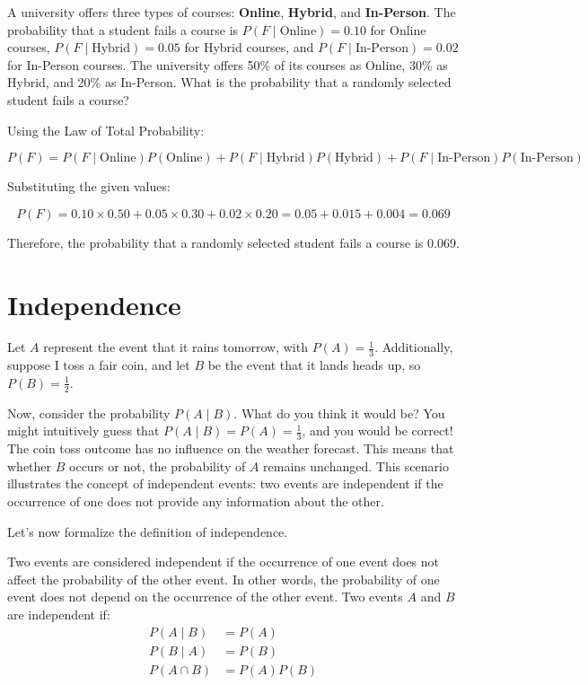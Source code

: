 \begin{example}
    A university offers three types of courses: \textbf{Online}, \textbf{Hybrid}, and \textbf{In-Person}. The probability that a student fails a course is \( P(F \mid \text{Online}) = 0.10 \) for Online courses, \( P(F \mid \text{Hybrid}) = 0.05 \) for Hybrid courses, and \( P(F \mid \text{In-Person}) = 0.02 \) for In-Person courses. The university offers 50\% of its courses as Online, 30\% as Hybrid, and 20\% as In-Person. What is the probability that a randomly selected student fails a course?
\end{example}

\begin{solution}
    Using the Law of Total Probability:

    \[
    P(F) = P(F \mid \text{Online}) P(\text{Online}) + P(F \mid \text{Hybrid}) P(\text{Hybrid}) + P(F \mid \text{In-Person}) P(\text{In-Person})
    \]

    Substituting the given values:

    \[
    P(F) = 0.10 \times 0.50 + 0.05 \times 0.30 + 0.02 \times 0.20 = 0.05 + 0.015 + 0.004 = 0.069
    \]

    Therefore, the probability that a randomly selected student fails a course is 0.069.
\end{solution}

\section{Independence}
Let $A$ represent the event that it rains tomorrow, with $P(A)=\frac{1}{3}$. Additionally, suppose I toss a fair coin, and let $B$ be the event that it lands heads up, so $P(B)=\frac{1}{2}$.

Now, consider the probability $P(A \mid B)$. What do you think it would be? You might intuitively guess that $P(A \mid B)=P(A)=\frac{1}{3}$, and you would be correct! The coin toss outcome has no influence on the weather forecast. This means that whether $B$ occurs or not, the probability of $A$ remains unchanged. This scenario illustrates the concept of independent events: two events are independent if the occurrence of one does not provide any information about the other.

Let's now formalize the definition of independence.

\begin{definition}[Independence]
    Two events are considered independent if the occurrence of one event does not affect the probability of the other event. In other words, the probability of one event does not depend on the occurrence of the other event. Two events \( A \) and \( B \) are independent if:
    \begin{align*}
        P(A \mid B) &= P(A) \\
        P(B \mid A) &= P(B) \\
        P(A \cap B) &= P(A) P(B)
    \end{align*}
\end{definition}

